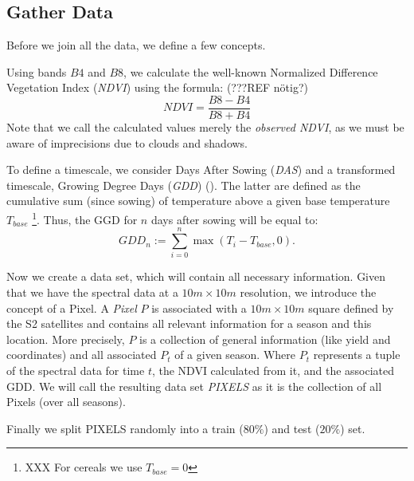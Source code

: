 	\subsection{Gather Data}{
		\label{sec:gather_data_to_pixel}
		Before we join all the data, we define a few concepts.

		{%
			Using bands $B4$ and $B8$, we calculate the well-known Normalized Difference Vegetation Index (\textit{NDVI}) using the formula: (???REF nötig?)
			\begin{equation}
				NDVI = \frac{B8 - B4}{B8 + B4}
				\label{eq:ndvi}
			\end{equation}
			Note that we call the calculated values merely the \textit{observed NDVI}, as we must be aware of imprecisions due to clouds and shadows. 
		}

		{%
			To define a timescale, we consider Days After Sowing (\textit{DAS}) and a transformed timescale, Growing Degree Days (\textit{GDD}) (\cite{mcmasterGrowingDegreedaysOne1997}). The latter are defined as the cumulative sum (since sowing) of temperature above a given base temperature $T_{base}$ \footnote{XXX For cereals we use $T_{base}=0$ }. Thus, the GGD for $n$ days after sowing will be equal to:
			\begin{equation}
				\label{eq:gdd}
				GDD_n := \sum_{i=0}^n \max(T_i - T_{base}, 0).
			\end{equation}
		} 

		Now we create a data set, which will contain all necessary information. Given that we have the spectral data at a $10m \times 10m$ resolution, we introduce the concept of a Pixel. A \textit{Pixel} $P$ is associated with a $10m \times 10m$ square defined by the S2 satellites and contains all relevant information for a season and this location. More precisely, $P$ is a collection of general information (like yield and coordinates) and all associated $P_t$ of a given season. Where $P_t$ represents a tuple of the spectral data for time $t$, the NDVI calculated from it, and the associated GDD. 
		We will call the resulting data set \textit{PIXELS} as it is the collection of all Pixels (over all seasons). 
		
		Finally we split PIXELS randomly into a train ($80\%$) and test  ($20\%$) set. 

	}

